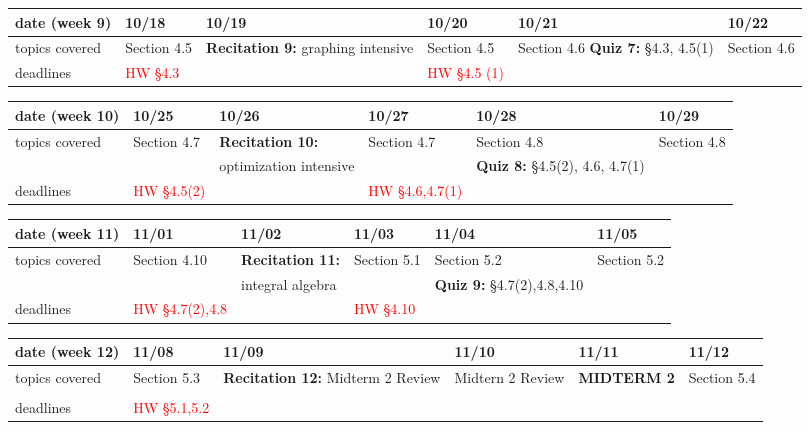 \documentclass[11pt,fleqn]{article}
\begin{document}
\vfill
\begin{tabularx}{\textwidth}{|X|| X | X | X | X | X |}
\hline
\rowcolor{gray!20}
date (week 9)&10/18&10/19&10/20&10/21&10/22\\ \hline
topics covered&Section 4.5&\textbf{Recitation 9:} graphing intensive&Section 4.5&Section 4.6 \textbf{Quiz 7:} \S 4.3, 4.5(1) &Section 4.6\\  \hline
deadlines&\textcolor{red}{HW \S 4.3}&&\textcolor{red}{HW \S 4.5 (1)}&& \\  \hline
\end{tabularx}
\vfill
\begin{tabularx}{\textwidth}{|X|| X | X | X | X | X |}
\hline
\rowcolor{gray!20}
date (week 10)&10/25&10/26&10/27&10/28&10/29\\ \hline
topics covered&Section 4.7&\textbf{Recitation 10:}&Section 4.7&Section 4.8&Section 4.8\\ 
&&optimization intensive&&\textbf{Quiz 8:} \: \quad \S 4.5(2), 4.6, 4.7(1)&\\ \hline
deadlines&\textcolor{red}{HW \S 4.5(2)}&&\textcolor{red}{HW \S 4.6,4.7(1)}&& \\ \hline 
\end{tabularx}
\vfill
\begin{tabularx}{\textwidth}{|X|| X | X | X | X | X |}
\hline
\rowcolor{gray!20}
date (week 11)&11/01&11/02&11/03&11/04&11/05\\ \hline
topics covered&Section 4.10&\textbf{Recitation 11:}&Section 5.1&Section 5.2&Section 5.2\\ 
&&integral algebra&&\textbf{Quiz 9:} \S4.7(2),4.8,4.10&\\ \hline
deadlines&\textcolor{red}{HW \S 4.7(2),4.8}&&\textcolor{red}{HW \S 4.10}&& \\ \hline 
\end{tabularx}
\vfill
\begin{tabularx}{\textwidth}{|X|| X | X | X | X | X |}
\hline
\rowcolor{gray!20}
date (week 12)&11/08&11/09&11/10&11/11&11/12\\ \hline
topics covered&Section 5.3&\textbf{Recitation 12:} Midterm 2 Review&Midtern 2 Review&\textcolor{dcyan}{\textbf{MIDTERM 2}}&Section 5.4\\ 
&&&&&\\ \hline
deadlines&\textcolor{red}{HW \S 5.1,5.2}&&&& \\ \hline
\end{tabularx}
\vfill
\newpage
\end{document}
